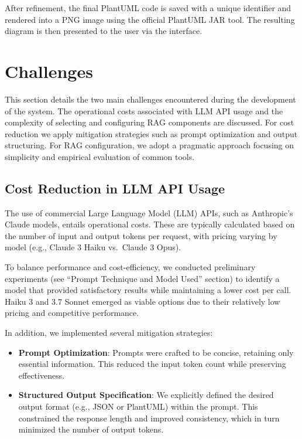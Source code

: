 After refinement, the final PlantUML code is saved with a unique identifier and rendered into a PNG image using the official PlantUML JAR tool. The resulting diagram is then presented to the user via the interface.

\section{Challenges}
\label{sec:challenges}
This section details the two main challenges encountered during the development of the system. 
The operational costs associated with LLM API usage and the complexity of selecting and configuring RAG components are discussed. 
For cost reduction we apply mitigation strategies such as prompt optimization and output structuring.
For RAG configuration, we adopt a pragmatic approach focusing on simplicity and empirical evaluation of common tools.

\subsection{Cost Reduction in LLM API Usage}

The use of commercial Large Language Model (LLM) APIs, such as Anthropic’s Claude models, entails operational costs. These are typically calculated based on the number of input and output tokens per request, with pricing varying by model (e.g., Claude 3 Haiku vs.\ Claude 3 Opus).

To balance performance and cost-efficiency, we conducted preliminary experiments (see ``Prompt Technique and Model Used'' section) to identify a model that provided satisfactory results while maintaining a lower cost per call. Haiku 3 and 3.7 Sonnet emerged as viable options due to their relatively low pricing and competitive performance.

In addition, we implemented several mitigation strategies:
\begin{itemize}
    \item \textbf{Prompt Optimization}: Prompts were crafted to be concise, retaining only essential information. This reduced the input token count while preserving effectiveness.
    \item \textbf{Structured Output Specification}: We explicitly defined the desired output format (e.g., JSON or PlantUML) within the prompt. This constrained the response length and improved consistency, which in turn minimized the number of output tokens.
\end{itemize}

